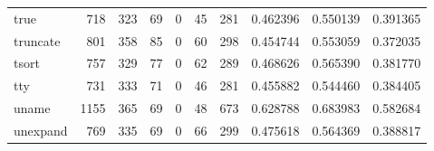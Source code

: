 \begin{longtable}{lrrrrrrrrr}
true      &                                                718 &                                                323 &                                                 69 &                                                  0 &                                                 45 &                                                281 &                                           0.462396 &                               0.550139 &                             0.391365 \\
truncate  &                                                801 &                                                358 &                                                 85 &                                                  0 &                                                 60 &                                                298 &                                           0.454744 &                               0.553059 &                             0.372035 \\
tsort     &                                                757 &                                                329 &                                                 77 &                                                  0 &                                                 62 &                                                289 &                                           0.468626 &                               0.565390 &                             0.381770 \\
tty       &                                                731 &                                                333 &                                                 71 &                                                  0 &                                                 46 &                                                281 &                                           0.455882 &                               0.544460 &                             0.384405 \\
uname     &                                               1155 &                                                365 &                                                 69 &                                                  0 &                                                 48 &                                                673 &                                           0.628788 &                               0.683983 &                             0.582684 \\
unexpand  &                                                769 &                                                335 &                                                 69 &                                                  0 &                                                 66 &                                                299 &                                           0.475618 &                               0.564369 &                             0.388817 \\

\end{longtable}
